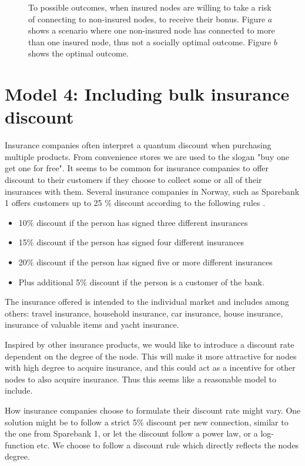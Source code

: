 \begin{figure}[t]
  \caption{\label{fig:bonusviolating} To possible outcomes, when insured nodes are willing to take a risk of connecting to non-insured nodes, to receive their bonus. Figure $a$ shows a scenario where one non-insured node has connected to more than one insured node, thus not a socially optimal outcome. Figure $b$ shows the optimal outcome. }
\end{figure}


\section{Model 4: Including bulk insurance discount}

Insurance companies often interpret a quantum discount when purchasing multiple products. From convenience stores we are used to the slogan "buy one get one for free". It seems to be common for insurance companies to offer discount to their customers if they choose to collect some or all of their insurances with them. Several insurance companies in Norway, such as Sparebank 1 offers customers up to 25 $\%$ discount according to the following rules \cite{sparebank1}. 

\begin{itemize}

\item 10$\%$ discount if the person has signed three different insurances
\item 15$\%$ discount if the person has signed four different insurances
\item 20$\%$ discount if the person has signed five or more different insurances
\item Plus additional 5$\%$ discount if the person is a customer of the bank. 

\end{itemize}

The insurance offered is intended to the individual market and includes among others: travel insurance, household insurance, car insurance, house insurance, insurance of valuable items and yacht insurance.

Inspired by other insurance products, we would like to introduce a discount rate dependent on the degree of the node. This will make it more attractive for nodes with high degree to acquire insurance, and this could act as a incentive for other nodes to also acquire insurance. Thus this seems like a reasonable model to include.  

How insurance companies choose to formulate their discount rate might vary. One solution might be to follow a strict 5$\%$ discount per new connection, similar to the one from Sparebank 1, or let the discount follow a power law, or a log-function etc. We choose to follow a discount rule which directly reflects the nodes degree.

